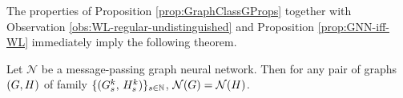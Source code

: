 

The properties of Proposition \ref{prop:GraphClassGProps} together with Observation \ref{obs:WL-regular-undistinguished} and Proposition \ref{prop:GNN-iff-WL} immediately imply the following theorem.

\begin{theorem}\label{thm:Ind1GNN}
    Let $\mathcal{N}$ be a message-passing graph neural network. Then for any pair of graphs $(G, H)$ of family  $\{(G_s^k,\, H_s^k)\}_{s \in \mathbb{N}}$, $\mathcal{N}(G) = \mathcal{N}(H)$.
\end{theorem}


